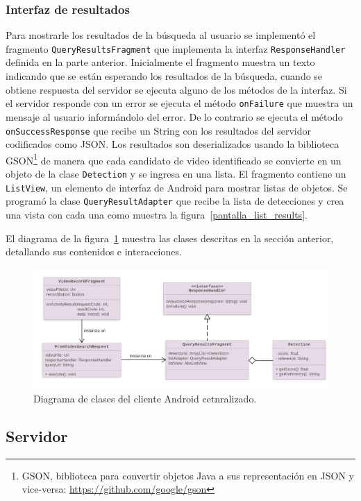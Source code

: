 \subsubsection*{Interfaz de resultados}
Para mostrarle los resultados de la búsqueda al usuario se implementó el fragmento \texttt{QueryResultsFragment} que implementa la interfaz \texttt{ResponseHandler} definida en la parte anterior. Inicialmente el fragmento muestra un texto indicando que se están esperando los resultados de la búsqueda, cuando se obtiene respuesta del servidor se ejecuta alguno de los métodos de la interfaz. Si el servidor responde con un error se ejecuta el método \texttt{onFailure} que muestra un mensaje al usuario informándolo del error. De lo contrario se ejecuta el método \texttt{onSuccessResponse} que recibe un String con los resultados del servidor codificados como JSON. Los resultados son deserializados usando la biblioteca GSON\footnote{GSON, biblioteca para convertir objetos Java a sus representación en JSON y vice-versa: \url{https://github.com/google/gson}} de manera que cada candidato de video identificado se convierte en un objeto de la clase \texttt{Detection} y se ingresa en una lista. El fragmento contiene un \texttt{ListView}, un elemento de interfaz de Android para mostrar listas de objetos. Se programó la clase \texttt{QueryResultAdapter} que recibe la lista de detecciones y crea una vista con cada una como muestra la figura~\ref{pantalla_list_results}.

El diagrama de la figura~\ref{diagrama_clases_centralizado} muestra las clases descritas en la sección anterior, detallando sus contenidos e interacciones.
	\begin{figure}[!h]
		\centering
		\includegraphics[scale=1.6]{imagenes/cap4/diagrama_cliente_centralizado.png}
		\caption{Diagrama de clases del cliente Android cetnralizado.}
		\label{diagrama_clases_centralizado}
	\end{figure}

\subsection{Servidor}

